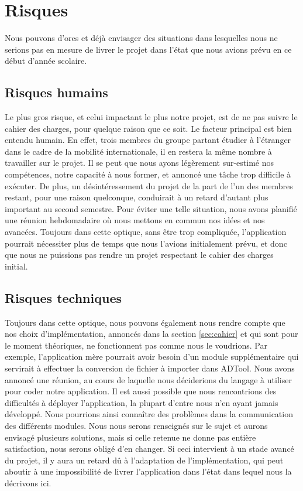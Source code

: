 \section{Risques}
    Nous pouvons d'ores et déjà envisager des situations dans lesquelles nous ne serions pas en mesure de livrer le projet dans l'état que nous avions prévu en ce début d'année scolaire.

    \subsection{Risques humains}

    Le plus gros risque, et celui impactant le plus notre projet, est de ne pas suivre le cahier des charges, pour quelque raison que ce soit.
    Le facteur principal est bien entendu humain. En effet, trois membres du groupe partant étudier à l'étranger dans le cadre de la mobilité internationale, il en restera la même nombre à travailler sur le projet. Il se peut que nous ayons légèrement sur-estimé nos compétences, notre capacité à nous former, et annoncé une tâche trop difficile à exécuter. De plus, un désintéressement du projet de la part de l'un des membres restant, pour une raison quelconque, conduirait à un retard d'autant plus important au second semestre. Pour éviter une telle situation, nous avons planifié une réunion hebdomadaire où nous mettons en commun nos idées et nos avancées. Toujours dans cette optique, sans être trop compliquée, l'application pourrait nécessiter plus de temps que nous l'avions initialement prévu, et donc que nous ne puissions pas rendre un projet respectant le cahier des charges initial.

    \subsection{Risques techniques}
    Toujours dans cette optique, nous pouvons également nous rendre compte que nos choix d'implémentation, annoncés dans la section \ref{sec:cahier} et qui sont pour le moment théoriques, ne fonctionnent pas comme nous le voudrions. Par exemple, l'application mère pourrait avoir besoin d'un module supplémentaire qui servirait à effectuer la conversion de fichier à importer dans ADTool. Nous avons annoncé une réunion, au cours de laquelle nous déciderions du langage à utiliser pour coder notre application.
    Il est aussi possible que nous rencontrions des difficultés à déployer l'application, la plupart d'entre nous n'en ayant jamais développé. Nous pourrions ainsi connaître des problèmes dans la communication des différents modules. Nous nous serons renseignés sur le sujet et aurons envisagé plusieurs solutions, mais si celle retenue ne donne pas entière satisfaction, nous serons obligé d'en changer. Si ceci intervient à un stade avancé du projet, il y aura un retard dû à l'adaptation de l'implémentation, qui peut aboutir à une impossibilité de livrer l'application dans l'état dans lequel nous la décrivons ici.

